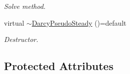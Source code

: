 \begin{DoxyCompactItemize}
\begin{DoxyCompactList}\small\item\em Solve method. \end{DoxyCompactList}\item 
virtual \hyperlink{classFVCode3D_1_1DarcyPseudoSteady_3_01QRMatrix_00_01QRFracture_00_01MatrixType_00_01BDF2_01_4_ae44498ab43117ab3c0e4a2dd860e59ef}{$\sim$\+Darcy\+Pseudo\+Steady} ()=default
\begin{DoxyCompactList}\small\item\em Destructor. \end{DoxyCompactList}\end{DoxyCompactItemize}
\subsection*{Protected Attributes}
